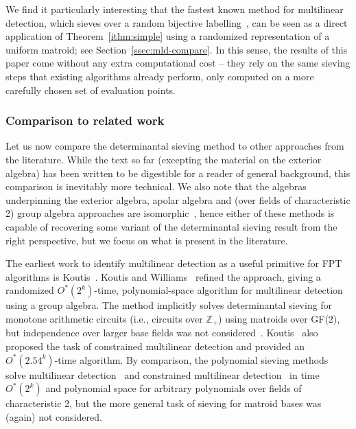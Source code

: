 \documentclass[10pt,a4paper]{article}
\begin{document}
We find it particularly interesting that the fastest known
method for multilinear detection, which sieves over a random bijective
labelling~\cite{Bjorklund14detsum,BjorklundHKK17narrow}, 
can be seen as a direct application of Theorem~\ref{ithm:simple}
using a randomized representation of a uniform matroid;
see Section~\ref{ssec:mld-compare}.
In this sense, the results of this paper come without any extra computational cost -- 
they rely on the same sieving steps that existing algorithms already perform, only computed on a more carefully chosen set of evaluation points.

\subsubsection{Comparison to related work} \label{ssec:related}
Let us now compare the determinantal sieving method to other
approaches from the literature. While the text so far (excepting the
material on the exterior algebra) has been written to be 
digestible for a reader of general background,
this comparison is inevitably more technical.
We also note that the algebras underpinning the
exterior algebra, apolar algebra and (over fields of characteristic 2)
group algebra approaches are isomorphic~\cite{Brand22note,BrandDH18},
hence either of these methods is capable of recovering some variant 
of the determinantal sieving result from the right perspective, but we focus on what is
present in the literature. 

The earliest work to identify multilinear detection as a useful
primitive for FPT algorithms is Koutis~\cite{Koutis05IPL}. Koutis and
Williams~\cite{Koutis08ICALP,KoutisW16limits,Williams09IPL} refined
the approach, giving a randomized $O^*(2^k)$-time, polynomial-space
algorithm for multilinear detection using a group algebra.
The method implicitly solves determinantal sieving for monotone
arithmetic circuits (i.e., circuits over $\mathbb{Z}_+$) using
matroids over GF(2), but independence over larger base fields was not considered~\cite{KoutisW16limits}.
Koutis~\cite{Koutis12motif} also proposed the task of constrained
multilinear detection and provided an $O^*(2.54^k)$-time algorithm.
By comparison, the polynomial sieving methods solve multilinear
detection~\cite{Bjorklund14detsum,BjorklundHKK17narrow}
and constrained multilinear detection~\cite{BjorklundKK16}
in time $O^*(2^k)$ and polynomial space
for arbitrary polynomials over fields of characteristic 2,
but the more general task of sieving for matroid bases was (again) not considered.  
\end{document}
